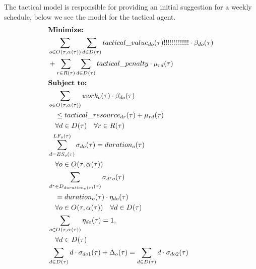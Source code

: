 The tactical model is responsible for providing an initial suggestion for a weekly schedule, below we see the model for the tactical agent.
\begin{alignat}{2}
	& \textbf{Minimize:} \notag\\
	& \sum_{\ElementOperation \in \SetOperation{}{\VarStrategicWorkOrderAssignment{}{}}} \sum_{\ElementDays \in \SetDays{}} \ParTacticalValue!!!!!!!!!!!!! \cdot \VarTacticalWork{\ElementDays}{\ElementOperation}\notag\\  
	& + \sum_{r \in \SetResource} \sum_{\ElementDays \in \SetDays{}} \ParTacticalPenalty \cdot \VarTacticalExcess                                               \\  
	& \textbf{Subject to:}                                                          \notag                                                                   \\
	& \sum_{\ElementOperation \in \SetOperation{}{\VarStrategicWorkOrderAssignment{}{}}} \ParOperationWork{\ElementOperation} \cdot \VarTacticalWork{\ElementDays}{\ElementOperation}\notag\\
	& \quad \leq \ParTacticalResource + \VarTacticalExcess\notag\\ 
	& \quad \forall \ElementDays \in \SetDays{} \quad \forall r \in \SetResource\\ 
	& \sum_{\ElementDays = \ParEarliestStart}^{\ParLatestFinish} \VarTacticalWorkBinary{\ElementDays}{\ElementOperation} = \ParDuration \notag\\
	& \quad \forall \ElementOperation \in \SetOperation{}{\VarStrategicWorkOrderAssignment{}{}} \\
	& \sum_{\ElementDays^* \in  \SetDays{\ParDuration}} \VarTacticalWorkBinary{\ElementDays^*}{\ElementOperation} \notag\\
	& \quad = \ParDuration \cdot \VarTacticalWorkBinaryConsecutive \notag\\ 
	& \quad \forall \ElementOperation \in \SetOperation{}{\VarStrategicWorkOrderAssignment{}{}} \quad \forall \ElementDays \in \SetDays{} \\
	& \sum_{\ElementOperation \in \SetOperation{}{\VarStrategicWorkOrderAssignment{}{}}} \VarTacticalWorkBinaryConsecutive = 1, \notag\\
	& \quad \forall \ElementDays \in \SetDays{} \notag\\
	& \sum_{\ElementDays \in \SetDays{}} \ElementDays \cdot \VarTacticalWorkBinary{\ElementDays}{\ElementOperation1} + \VarTacticalOperationDifference  = \sum_{\ElementDays \in \SetDays{}} \ElementDays \cdot \VarTacticalWorkBinary{\ElementDays}{\ElementOperation2}                   \notag  \\ 

\end{alignat}
